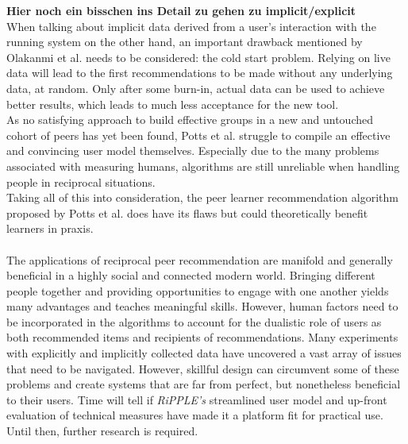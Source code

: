 \documentclass[conference]{IEEEtran}
\begin{document}
\textbf{Hier noch ein bisschen ins Detail zu gehen zu implicit/explicit}\\
When talking about implicit data derived from a user's interaction with the running system on the other hand, an important drawback mentioned by Olakanmi et al. needs to be considered: the cold start problem. \cite{olakanmi2017group} Relying on live data will lead to the first recommendations to be made without any underlying data, at random. Only after some burn-in, actual data can be used to achieve better results, which leads to much less acceptance for the new tool.\\
As no satisfying approach to build effective groups in a new and untouched cohort of peers has yet been found, Potts et al. struggle to compile an effective and convincing user model themselves. Especially due to the many problems associated with measuring humans, algorithms are still unreliable when handling people in reciprocal situations.\\ 
Taking all of this into consideration, the peer learner recommendation algorithm proposed by Potts et al. does have its flaws but could theoretically benefit learners in praxis.\\
\\
The applications of reciprocal peer recommendation are manifold and generally beneficial in a highly social and connected modern world. Bringing different people together and providing opportunities to engage with one another yields many advantages and teaches meaningful skills. However, human factors need to be incorporated in the algorithms to account for the dualistic role of users as both recommended items and recipients of recommendations. Many experiments with explicitly and implicitly collected data have uncovered a vast array of issues that need to be navigated. However, skillful design can circumvent some of these problems and create systems that are far from perfect, but nonetheless beneficial to their users. Time will tell if \textit{RiPPLE's} streamlined user model and up-front evaluation of technical measures have made it a platform fit for practical use. Until then, further research is required.\\
\end{document}
